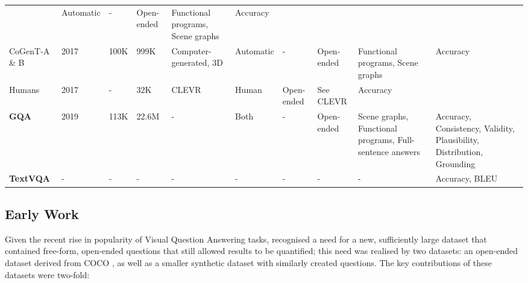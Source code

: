 \begin{landscape}
\begin{footnotesize}
\begin{center}
\begin{longtable}[c]{llllllllll}
          & Automatic
          & -
          & Open-ended
          & Functional programs, Scene graphs
          & Accuracy \\
          CoGenT-A \& B
          & 2017
          & 100K
          & 999K
          & Computer-generated, 3D 
          & Automatic
          & -
          & Open-ended
          & Functional programs, Scene graphs
          & Accuracy \\
          Humans
          & 2017
          & -
          & 32K  %
          & CLEVR
          & Human
          & Open-ended
          & See CLEVR
          & Accuracy \\
          \textbf{GQA} \cite{hudson2019gqa}
          & 2019
          & 113K  %
          & 22.6M  %
          & -
          & Both
          & -
          & Open-ended
          & Scene graphs, Functional programs, Full-sentence answers
          & Accuracy, Consistency, Validity, Plausibility, Distribution, Grounding \\
          \textbf{TextVQA} \cite{singh2019towards}
          & -
          & -
          & -
          & -
          & -
          & -
          & -
          & -
          & Accuracy, BLEU \\
          \end{longtable}
      \end{center}
  \end{footnotesize}
\end{landscape}


\subsection{Early Work} 

Given the recent rise in popularity of Visual Question Answering tasks, \citeauthor{antol2015vqa} recognised a need for a new, sufficiently large dataset that contained free-form, open-ended questions that still allowed results to be quantified; this need was realised by two datasets: an open-ended dataset derived from COCO \cite{lin2014microsoft}, as well as a smaller synthetic dataset with similarly created questions.\cite{antol2015vqa} The key contributions of these datasets were two-fold:

